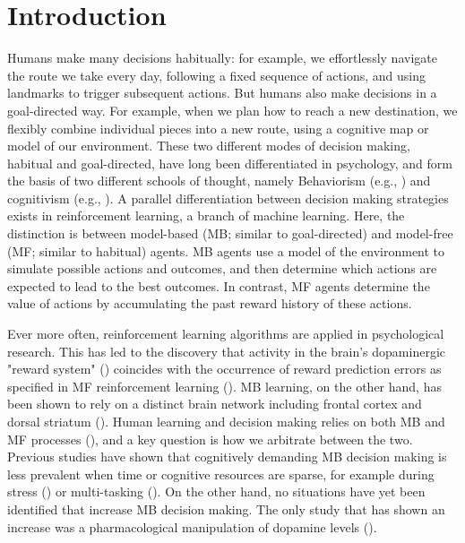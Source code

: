 \documentclass[11pt]{article} %
\begin{document}



\startmain

\section{Introduction}

Humans make many decisions habitually: for example, we effortlessly navigate the route we take every day, following a fixed sequence of actions, and using landmarks to trigger subsequent actions. But humans also make decisions in a goal-directed way. For example, when we plan how to reach a new destination, we flexibly combine individual pieces into a new route, using a cognitive map or model of our environment. These two different modes of decision making, habitual and goal-directed, have long been differentiated in psychology, and form the basis of two different schools of thought, namely Behaviorism (e.g., \cite{skinner_why_1977}) and cognitivism (e.g., \cite{tolman_cognitive_1948}). A parallel differentiation between decision making strategies exists in reinforcement learning, a branch of machine learning. Here, the distinction is between model-based (MB; similar to goal-directed) and model-free (MF; similar to habitual) agents. MB agents use a model of the environment to simulate possible actions and outcomes, and then determine which actions are expected to lead to the best outcomes. In contrast, MF agents determine the value of actions by accumulating the past reward history of these actions.

Ever more often, reinforcement learning algorithms are applied in psychological research. This has led to the discovery that activity in the brain's dopaminergic "reward system" (\cite{wise_brain_1989}) coincides with the occurrence of reward prediction errors as specified in MF reinforcement learning (\cite{schultz_neural_1997}). MB learning, on the other hand, has been shown to rely on a distinct brain network including frontal cortex and dorsal striatum (\cite{dolan_goals_2013}). Human learning and decision making relies on both MB and MF processes (\cite{daw_model-based_2011}), and a key question is how we arbitrate between the two. Previous studies have shown that cognitively demanding MB decision making is less prevalent when time or cognitive resources are sparse, for example during stress (\cite{schwabe_stress-induced_2011}) or multi-tasking (\cite{otto_curse_2013}). On the other hand, no situations have yet been identified that increase MB decision making. The only study that has shown an increase was a pharmacological manipulation of dopamine levels (\cite{wunderlich_dopamine_2012}). 
\end{document}
